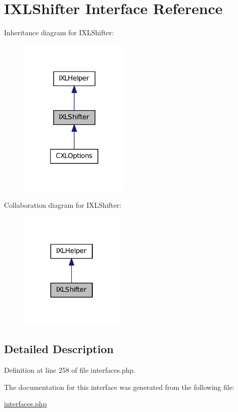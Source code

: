 \hypertarget{interfaceIXLShifter}{
\section{IXLShifter Interface Reference}
\label{interfaceIXLShifter}
}


Inheritance diagram for IXLShifter:\nopagebreak
\begin{figure}[H]
\begin{center}
\leavevmode
\includegraphics[width=150pt]{interfaceIXLShifter__inherit__graph}
\end{center}
\end{figure}


Collaboration diagram for IXLShifter:\nopagebreak
\begin{figure}[H]
\begin{center}
\leavevmode
\includegraphics[width=142pt]{interfaceIXLShifter__coll__graph}
\end{center}
\end{figure}


\subsection{Detailed Description}


Definition at line 258 of file interfaces.php.



The documentation for this interface was generated from the following file:\begin{DoxyCompactItemize}
\item 
\hyperlink{interfaces_8php}{interfaces.php}\end{DoxyCompactItemize}
